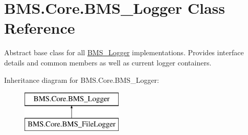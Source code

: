 \hypertarget{class_b_m_s_1_1_core_1_1_b_m_s___logger}{\section{B\-M\-S.\-Core.\-B\-M\-S\-\_\-\-Logger Class Reference}
\label{class_b_m_s_1_1_core_1_1_b_m_s___logger}
}


Abstract base class for all \hyperlink{class_b_m_s_1_1_core_1_1_b_m_s___logger}{B\-M\-S\-\_\-\-Logger} implementations. Provides interface details and common members as well as current logger containers.  


Inheritance diagram for B\-M\-S.\-Core.\-B\-M\-S\-\_\-\-Logger\-:\begin{figure}[H]
\begin{center}
\leavevmode
\includegraphics[height=2.000000cm]{class_b_m_s_1_1_core_1_1_b_m_s___logger}
\end{center}
\end{figure}
